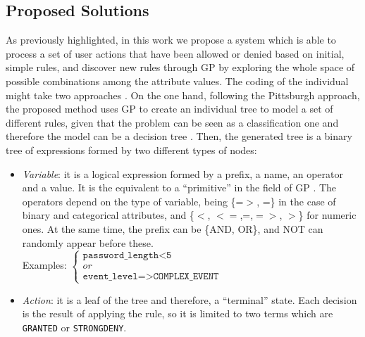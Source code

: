 \documentclass[a4paper,10pt,twocolumn,preprint,3p]{elsarticle}
\begin{document}
\subsection{Proposed Solutions}
\label{subsec:solution}

As previously highlighted, in this work we propose a system which is
able to process a set of user actions that have been allowed or denied
based on initial, simple rules, and discover new rules through GP by exploring
the whole space of possible combinations among the attribute
values. The coding of the individual might take two approaches \cite{freitas2002data}. On the one hand, following the Pittsburgh approach, the proposed method uses GP to create an individual tree to model a set of different rules, given that the problem can be seen as a
classification one and therefore the model can be a decision tree
\cite{safavian1990survey}. Then, the generated tree is a binary tree
of expressions formed by two different types of nodes:

\begin{itemize}
\item {\em Variable}: it is a logical expression formed by a prefix, a name, an operator and a value. It is the equivalent to a ``primitive'' in the field of GP \cite{back1996evolutionary}. The operators depend on the type of variable, being \{=$>$, =\} in the case of binary and categorical attributes, and \{$<$, $<=$,=,$=>$, $>$\} for numeric ones. At the same time, the prefix can be \{AND, OR\}, and NOT can randomly appear before these. \\
    Examples:
   \begin{math}
     \left \{
   \begin{array}{l}
     \texttt{password\_length<5} \\
     or \\
      \texttt{event\_level=>COMPLEX\_EVENT}
   \end{array}
   \right .
   \end{math}
\item {\em Action}: it is a leaf of the tree and therefore, a ``terminal'' state. Each decision is the result of applying the rule, so it is limited to two terms which are \texttt{GRANTED} or \texttt{STRONGDENY}.
\end{itemize}
\end{document}
